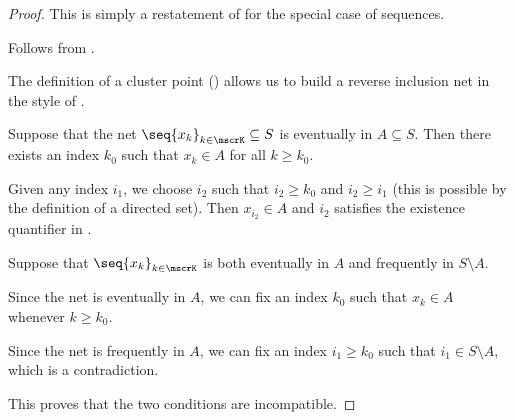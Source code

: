 \begin{proof}
   This is simply a restatement of  for the special case of sequences.

   Follows from .

  The definition of a cluster point () allows us to build a reverse inclusion net in the style of .

   Suppose that the net \( \seq{ x_k }_{k \in \mscrK} \subseteq S \) is eventually in \( A \subseteq S \). Then there exists an index \( k_0 \) such that \( x_k \in A \) for all \( k \geq k_0 \).

  Given any index \( i_1 \), we choose \( i_2 \) such that \( i_2 \geq k_0 \) and \( i_2 \geq i_1 \) (this is possible by the definition of a directed set). Then \( x_{i_2} \in A \) and \( i_2 \) satisfies the existence quantifier in .

   Suppose that \( \seq{ x_k }_{k \in \mscrK} \) is both eventually in \( A \) and frequently in \( S \setminus A \).

  Since the net is eventually in \( A \), we can fix an index \( k_0 \) such that \( x_k \in A \) whenever \( k \geq k_0 \).

  Since the net is frequently in \( A \), we can fix an index \( i_1 \geq k_0 \) such that \( i_1 \in S \setminus A \), which is a contradiction.

  This proves that the two conditions are incompatible.
\end{proof}

